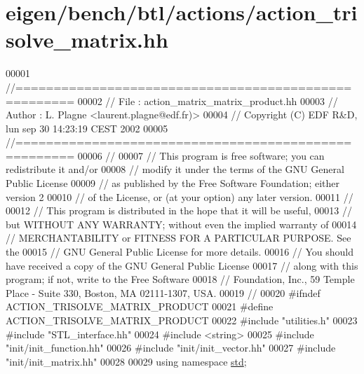 \hypertarget{eigen_2bench_2btl_2actions_2action__trisolve__matrix_8hh_source}{}\section{eigen/bench/btl/actions/action\+\_\+trisolve\+\_\+matrix.hh}
\label{eigen_2bench_2btl_2actions_2action__trisolve__matrix_8hh_source}

\begin{DoxyCode}
00001 \textcolor{comment}{//=====================================================}
00002 \textcolor{comment}{// File   :  action\_matrix\_matrix\_product.hh}
00003 \textcolor{comment}{// Author :  L. Plagne <laurent.plagne@edf.fr)>}
00004 \textcolor{comment}{// Copyright (C) EDF R&D,  lun sep 30 14:23:19 CEST 2002}
00005 \textcolor{comment}{//=====================================================}
00006 \textcolor{comment}{//}
00007 \textcolor{comment}{// This program is free software; you can redistribute it and/or}
00008 \textcolor{comment}{// modify it under the terms of the GNU General Public License}
00009 \textcolor{comment}{// as published by the Free Software Foundation; either version 2}
00010 \textcolor{comment}{// of the License, or (at your option) any later version.}
00011 \textcolor{comment}{//}
00012 \textcolor{comment}{// This program is distributed in the hope that it will be useful,}
00013 \textcolor{comment}{// but WITHOUT ANY WARRANTY; without even the implied warranty of}
00014 \textcolor{comment}{// MERCHANTABILITY or FITNESS FOR A PARTICULAR PURPOSE.  See the}
00015 \textcolor{comment}{// GNU General Public License for more details.}
00016 \textcolor{comment}{// You should have received a copy of the GNU General Public License}
00017 \textcolor{comment}{// along with this program; if not, write to the Free Software}
00018 \textcolor{comment}{// Foundation, Inc., 59 Temple Place - Suite 330, Boston, MA  02111-1307, USA.}
00019 \textcolor{comment}{//}
00020 \textcolor{preprocessor}{#ifndef ACTION\_TRISOLVE\_MATRIX\_PRODUCT}
00021 \textcolor{preprocessor}{#define ACTION\_TRISOLVE\_MATRIX\_PRODUCT}
00022 \textcolor{preprocessor}{#include "utilities.h"}
00023 \textcolor{preprocessor}{#include "STL\_interface.hh"}
00024 \textcolor{preprocessor}{#include <string>}
00025 \textcolor{preprocessor}{#include "init/init\_function.hh"}
00026 \textcolor{preprocessor}{#include "init/init\_vector.hh"}
00027 \textcolor{preprocessor}{#include "init/init\_matrix.hh"}
00028 
00029 \textcolor{keyword}{using namespace }\hyperlink{namespacestd}{std};

\end{DoxyCode}

